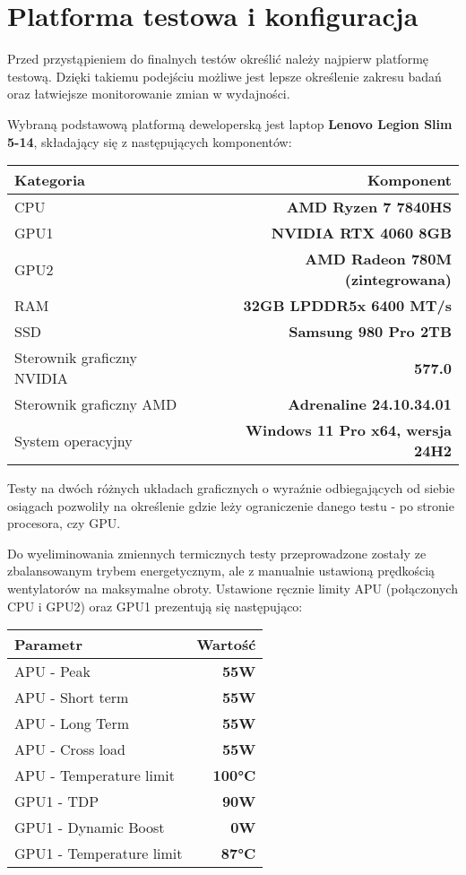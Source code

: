 \chapter{Platforma testowa i konfiguracja}

Przed przystąpieniem do finalnych testów określić należy najpierw
platformę testową. Dzięki takiemu podejściu możliwe jest lepsze określenie zakresu
badań oraz łatwiejsze monitorowanie zmian w wydajności.

Wybraną podstawową platformą deweloperską jest laptop \textbf{Lenovo Legion Slim 5-14}, składający się z następujących komponentów:

\begin{center}
	\begin{tabular}{ |l r| }
		\hline
		\textbf{Kategoria} & \textbf{Komponent} \\
		\hline
		CPU & \textbf{AMD Ryzen 7 7840HS} \\
		GPU1 & \textbf{NVIDIA RTX 4060 8GB} \\
		GPU2 & \textbf{AMD Radeon 780M (zintegrowana)} \\
		RAM & \textbf{32GB LPDDR5x 6400 MT/s} \\
		SSD & \textbf{Samsung 980 Pro 2TB} \\
		Sterownik graficzny NVIDIA & \textbf{577.0} \\
		Sterownik graficzny AMD & \textbf{Adrenaline 24.10.34.01} \\
		System operacyjny & \textbf{Windows 11 Pro x64, wersja 24H2} \\
		\hline
	\end{tabular}
\end{center}

Testy na dwóch różnych układach graficznych o wyraźnie odbiegających od siebie osiągach pozwoliły na określenie gdzie leży ograniczenie danego testu - po stronie procesora, czy GPU.

Do wyeliminowania zmiennych termicznych testy przeprowadzone zostały ze zbalansowanym trybem energetycznym, ale z manualnie ustawioną prędkością wentylatorów na maksymalne obroty. Ustawione ręcznie limity APU (połączonych CPU i GPU2) oraz GPU1 prezentują się następująco:

\begin{center}
	\begin{tabular}{ |l r| }
		\hline
		\textbf{Parametr} & \textbf{Wartość} \\
		\hline
		APU - Peak & \textbf{55W} \\
		APU - Short term & \textbf{55W} \\
		APU - Long Term & \textbf{55W} \\
		APU - Cross load & \textbf{55W} \\
		APU - Temperature limit & \textbf{100°C} \\
		GPU1 - TDP & \textbf{90W} \\
		GPU1 - Dynamic Boost & \textbf{0W} \\
		GPU1 - Temperature limit & \textbf{87°C} \\
		\hline
	\end{tabular}
\end{center}

